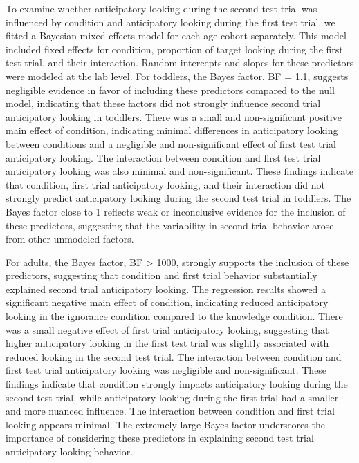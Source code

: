 \documentclass[
  man,floatsintext]{apa6}
\begin{document}
To examine whether anticipatory looking during the second test trial was influenced by condition and anticipatory looking during the first test trial, we fitted a Bayesian mixed-effects model for each age cohort separately. This model included fixed effects for condition, proportion of target looking during the first test trial, and their interaction. Random intercepts and slopes for these predictors were modeled at the lab level. For toddlers, the Bayes factor, BF = 1.1, suggests negligible evidence in favor of including these predictors compared to the null model, indicating that these factors did not strongly influence second trial anticipatory looking in toddlers. There was a small and non-significant positive main effect of condition, indicating minimal differences in anticipatory looking between conditions and a negligible and non-significant effect of first test trial anticipatory looking. The interaction between condition and first test trial anticipatory looking was also minimal and non-significant. These findings indicate that condition, first trial anticipatory looking, and their interaction did not strongly predict anticipatory looking during the second test trial in toddlers. The Bayes factor close to 1 reflects weak or inconclusive evidence for the inclusion of these predictors, suggesting that the variability in second trial behavior arose from other unmodeled factors.

For adults, the Bayes factor, BF \textgreater{} 1000, strongly supports the inclusion of these predictors, suggesting that condition and first trial behavior substantially explained second trial anticipatory looking. The regression results showed a significant negative main effect of condition, indicating reduced anticipatory looking in the ignorance condition compared to the knowledge condition. There was a small negative effect of first trial anticipatory looking, suggesting that higher anticipatory looking in the first test trial was slightly associated with reduced looking in the second test trial.
The interaction between condition and first test trial anticipatory looking was negligible and non-significant. These findings indicate that condition strongly impacts anticipatory looking during the second test trial, while anticipatory looking during the first trial had a smaller and more nuanced influence. The interaction between condition and first trial looking appears minimal. The extremely large Bayes factor underscores the importance of considering these predictors in explaining second test trial anticipatory looking behavior.
\end{document}
